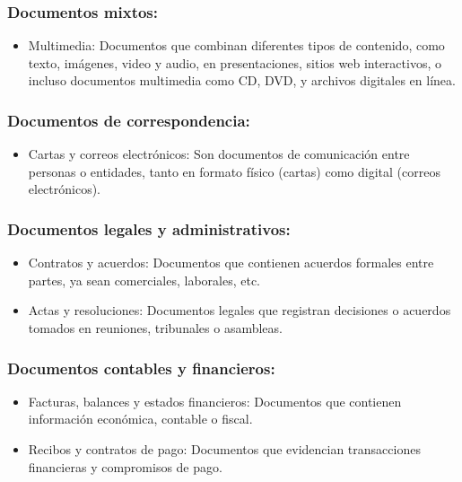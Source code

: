 \documentclass{article}
\begin{document}
\subsubsection{Documentos mixtos:}

\begin{itemize}
    \item   Multimedia: Documentos que combinan diferentes tipos de contenido, como texto, imágenes, video y audio, en presentaciones, sitios web interactivos, o incluso documentos multimedia como CD, DVD, y archivos digitales en línea.
\end{itemize}

\subsubsection{Documentos de correspondencia:}

\begin{itemize}
    \item   Cartas y correos electrónicos: Son documentos de comunicación entre personas o entidades, tanto en formato físico (cartas) como digital (correos electrónicos).
\end{itemize}

\subsubsection{Documentos legales y administrativos:}

\begin{itemize}
    \item   Contratos y acuerdos: Documentos que contienen acuerdos formales entre partes, ya sean comerciales, laborales, etc.
    \item   Actas y resoluciones: Documentos legales que registran decisiones o acuerdos tomados en reuniones, tribunales o asambleas.
\end{itemize}

\subsubsection{Documentos contables y financieros:}

\begin{itemize}
    \item   Facturas, balances y estados financieros: Documentos que contienen información económica, contable o fiscal.
    \item   Recibos y contratos de pago: Documentos que evidencian transacciones financieras y compromisos de pago.
\end{itemize}
\end{document}
